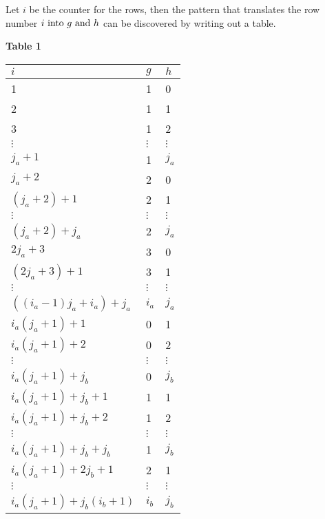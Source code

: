 Let $i$ be the counter for the rows, then the pattern that translates the row
number $i\text{ into } g\text{ and } h$ can be discovered by writing out a table.

\textbf{Table 1}

\begin{center} \begin{tabular}{|p{1.0in}|p{0.2in}|p{0.2in}|} \hline 
    $i$ & $g$ & $h$ \\ \hline 
    1 & 1 & 0 \\ \hline 
    2 & 1 & 1 \\ \hline 
    3 & 1 & 2 \\ \hline 
    $\vdots $ & $\vdots $ & $\vdots $ \\ \hline 
    $j_{a} +1$ & 1 & $j_{a} $ \\ \hline 
    $j_{a} +2$ & 2 & 0 \\ \hline 
    $\left(j_{a} +2\right)+1$ & 2 & 1 \\ \hline 
    $\vdots $ & $\vdots $ & $\vdots $ \\ \hline 
    $\left(j_{a} +2\right)+j_{a} $ & 2 & $j_{a} $ \\ \hline 
    $2j_{a} +3$ & 3 & 0 \\ \hline 
    $\left(2j_{a} +3\right)+1$ & 3 & 1 \\ \hline 
    $\vdots $ & $\vdots $ & $\vdots $ \\ \hline 
    $\left(\left(i_{a} -1\right)j_{a} +i_{a} \right)+j_{a} $ & $i_{a} $ & $j_{a} $
    \\ \hline
    $i_{a} \left(j_{a} +1\right)+1$ & 0 & 1 \\ \hline 
    $i_{a} \left(j_{a} +1\right)+2$ & 0 & 2 \\ \hline 
    $\vdots $ & $\vdots $ & $\vdots $ \\ \hline 
    $i_{a} \left(j_{a} +1\right)+j_{b} $ & 0 & $j_{b} $ \\ \hline 
    $i_{a} \left(j_{a} +1\right)+j_{b} +1$ & 1 & 1 \\ \hline 
    $i_{a} \left(j_{a} +1\right)+j_{b} +2$ & 1 & 2 \\ \hline 
    $\vdots $ & $\vdots $ & $\vdots $ \\ \hline 
    $i_{a} \left(j_{a} +1\right)+j_{b} +j_{b} $ & 1 & $j_{b} $ \\ \hline 
    $i_{a} \left(j_{a} +1\right)+2j_{b} +1$ & 2 & 1 \\ \hline 
    $\vdots $ & $\vdots $ & $\vdots $ \\ \hline 
    $i_{a} \left(j_{a} +1\right)+j_{b} \left(i_{b} +1\right)$ & $i_{b} $ & $j_{b} $
    \\ \hline
\end{tabular} \end{center}

